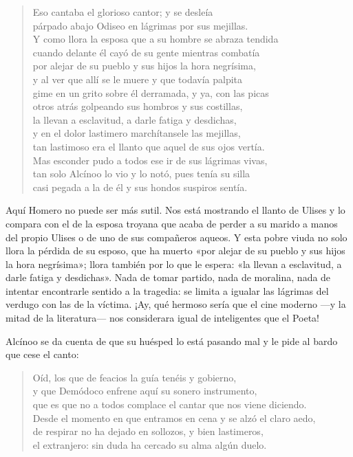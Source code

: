 \begin{verse}
Eso cantaba el glorioso cantor; y se desleía\\
párpado abajo Odiseo en lágrimas por sus mejillas.\\
Y como llora la esposa que a su hombre se abraza tendida\\
cuando delante él cayó de su gente mientras combatía\\
por alejar de su pueblo y sus hijos la hora negrísima,\\
y al ver que allí se le muere y que todavía palpita\\
gime en un grito sobre él derramada, y ya, con las picas\\
otros atrás golpeando sus hombros y sus costillas,\\
la llevan a esclavitud, a darle fatiga y desdichas,\\
y en el dolor lastimero marchítansele las mejillas,\\
tan lastimoso era el llanto que aquel de sus ojos vertía.\\
Mas esconder pudo a todos ese ir de sus lágrimas vivas,\\
tan solo Alcínoo lo vio y lo notó, pues tenía su silla\\
casi pegada a la de él y sus hondos suspiros sentía.
\end{verse}

Aquí Homero no puede ser más sutil. Nos está mostrando el llanto de Ulises y lo compara con el de la esposa troyana que acaba de perder a su marido a manos del propio Ulises o de uno de sus compañeros aqueos. Y esta pobre viuda no solo llora la pérdida de su esposo, que ha muerto «por alejar de su pueblo y sus hijos la hora negrísima»; llora también por lo que le espera: «la llevan a esclavitud, a darle fatiga y desdichas». Nada de tomar partido, nada de moralina, nada de intentar encontrarle sentido a la tragedia: se limita a igualar las lágrimas del verdugo con las de la víctima. ¡Ay, qué hermoso sería que el cine moderno ---y la mitad de la literatura--- nos considerara igual de inteligentes que el Poeta!


Alcínoo se da cuenta de que su huésped lo está pasando mal y le pide al bardo que cese el canto:

\begin{verse}
Oíd, los que de feacios la guía tenéis y gobierno,\\
y que Demódoco enfrene aquí su sonero instrumento,\\
que es que no a todos complace el cantar que nos viene diciendo.\\
Desde el momento en que entramos en cena y se alzó el claro aedo,\\
de respirar no ha dejado en sollozos, y bien lastimeros,\\
el extranjero: sin duda ha cercado su alma algún duelo.
\end{verse}

